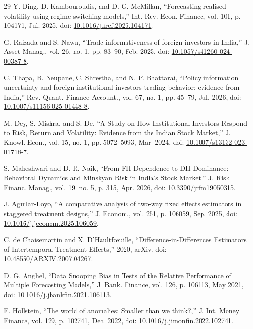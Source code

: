 \documentclass{ieeeaccess}
\begin{document}
\begin{thebibliography}{29}
 Y. Ding, D. Kambouroudis, and D. G. McMillan, ``Forecasting realised volatility using regime-switching models,'' Int. Rev. Econ. Finance, vol. 101, p. 104171, Jul. 2025, doi: \url{10.1016/j.iref.2025.104171}.

 G. Raizada and S. Nawn, ``Trade informativeness of foreign investors in India,'' J. Asset Manag., vol. 26, no. 1, pp. 83--90, Feb. 2025, doi: \url{10.1057/s41260-024-00387-8}.

 C. Thapa, B. Neupane, C. Shrestha, and N. P. Bhattarai, ``Policy information uncertainty and foreign institutional investors trading behavior: evidence from India,'' Rev. Quant. Finance Account., vol. 67, no. 1, pp. 45--79, Jul. 2026, doi: \url{10.1007/s11156-025-01448-8}.

 M. Dey, S. Mishra, and S. De, ``A Study on How Institutional Investors Respond to Risk, Return and Volatility: Evidence from the Indian Stock Market,'' J. Knowl. Econ., vol. 15, no. 1, pp. 5072--5093, Mar. 2024, doi: \url{10.1007/s13132-023-01718-7}.

 S. Maheshwari and D. R. Naik, ``From FII Dependence to DII Dominance: Behavioral Dynamics and Minskyan Risk in India's Stock Market,'' J. Risk Financ. Manag., vol. 19, no. 5, p. 315, Apr. 2026, doi: \url{10.3390/jrfm19050315}.

 J. Aguilar-Loyo, ``A comparative analysis of two-way fixed effects estimators in staggered treatment designs,'' J. Econom., vol. 251, p. 106059, Sep. 2025, doi: \url{10.1016/j.jeconom.2025.106059}.

 C. de Chaisemartin and X. D'Haultf{\oe}uille, ``Difference-in-Differences Estimators of Intertemporal Treatment Effects,'' 2020, arXiv. doi: \url{10.48550/ARXIV.2007.04267}.

 D. G. Anghel, ``Data Snooping Bias in Tests of the Relative Performance of Multiple Forecasting Models,'' J. Bank. Finance, vol. 126, p. 106113, May 2021, doi: \url{10.1016/j.jbankfin.2021.106113}.

 F. Hollstein, ``The world of anomalies: Smaller than we think?,'' J. Int. Money Finance, vol. 129, p. 102741, Dec. 2022, doi: \url{10.1016/j.jimonfin.2022.102741}.

\end{thebibliography}
\end{document}
